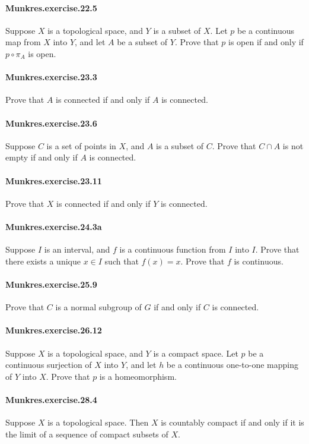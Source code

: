 \documentclass{article}
\begin{document}
\paragraph{Munkres.exercise.22.5} Suppose $X$ is a topological space, and $Y$ is a subset of $X$. Let $p$ be a continuous map from $X$ into $Y$, and let $A$ be a subset of $Y$. Prove that $p$ is open if and only if $p \circ \pi_A$ is open.

\paragraph{Munkres.exercise.23.3} Prove that $A$ is connected if and only if $A$ is connected.

\paragraph{Munkres.exercise.23.6} Suppose $C$ is a set of points in $X$, and $A$ is a subset of $C$. Prove that $C ∩ A$ is not empty if and only if $A$ is connected.

\paragraph{Munkres.exercise.23.11} Prove that $X$ is connected if and only if $Y$ is connected.

\paragraph{Munkres.exercise.24.3a} Suppose $I$ is an interval, and $f$ is a continuous function from $I$ into $I$. Prove that there exists a unique $x \in I$ such that $f(x) = x$. Prove that $f$ is continuous.

\paragraph{Munkres.exercise.25.9} Prove that $C$ is a normal subgroup of $G$ if and only if $C$ is connected.

\paragraph{Munkres.exercise.26.12} Suppose $X$ is a topological space, and $Y$ is a compact space. Let $p$ be a continuous surjection of $X$ into $Y$, and let $h$ be a continuous one-to-one mapping of $Y$ into $X$. Prove that $p$ is a homeomorphism.

\paragraph{Munkres.exercise.28.4} Suppose $X$ is a topological space. Then $X$ is countably compact if and only if it is the limit of a sequence of compact subsets of $X$.
\end{document}
